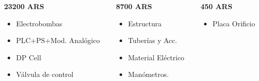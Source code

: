 {\begin{columns}[T]
	 \begin{column}{0.3\textwidth}
	    \begin{techintblock}
		\centering
		\textbf{23200 ARS}
	    \end{techintblock}
	    \footnotesize
	    \begin{itemize}
	     \item Electrobombas
	     \item PLC+PS+Mod. Analógico
	     \item DP Cell
	     \item Válvula de control
	    \end{itemize}
	 \end{column}
	 
	 \begin{column}{0.3\textwidth}
	    \begin{fingblock}
		\centering
		\textbf{8700 ARS}
	    \end{fingblock}
	    \footnotesize
	     \begin{itemize}
	      \item Estructura
	      \item Tuberías y Acc.
	      \item Material Eléctrico
	      \item Manómetros.
	     \end{itemize}
	 \end{column}

	 \begin{column}{0.3\textwidth}
	    \begin{puglesiblock}
		\centering
		\textbf{450 ARS}
	    \end{puglesiblock}
	    \footnotesize
	    \begin{itemize}
	     \item Placa Orificio
	    \end{itemize}

	 \end{column}

	\end{columns}
	
}

